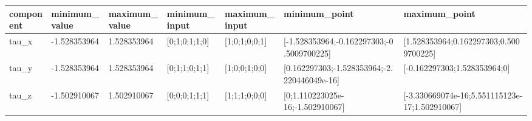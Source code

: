 \begin{tabular}{@{}lllllll@{}}
\toprule
component & minimum\_value & maximum\_value & minimum\_input & maximum\_input & minimum\_point & maximum\_point \\
\midrule
tau\_x & -1.528353964 & 1.528353964 & [0;1;0;1;1;0] & [1;0;1;0;0;1] & [-1.528353964;-0.162297303;-0.5009700225] & [1.528353964;0.162297303;0.5009700225] \\
tau\_y & -1.528353964 & 1.528353964 & [0;1;1;0;1;1] & [1;0;0;1;0;0] & [0.162297303;-1.528353964;-2.220446049e-16] & [-0.162297303;1.528353964;0] \\
tau\_z & -1.502910067 & 1.502910067 & [0;0;0;1;1;1] & [1;1;1;0;0;0] & [0;1.110223025e-16;-1.502910067] & [-3.330669074e-16;5.551115123e-17;1.502910067] \\
\bottomrule
\end{tabular}
